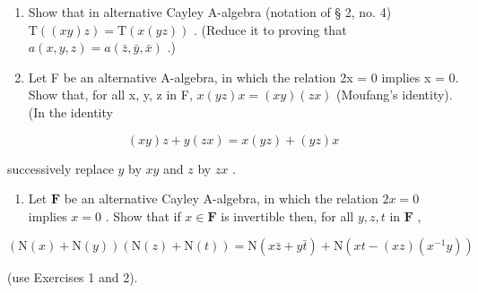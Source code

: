 \BourbakiAppendixExercises

\begin{enumerate}
\def\labelenumi{\arabic{enumi}.}
\item
  Show that in alternative Cayley A-algebra (notation of § 2, no. 4) \(\mathrm{T}((xy)z) = \mathrm{T}(x(yz))\) . (Reduce it to proving that \(a(x,y,z) = a(\bar{z},\bar{y},\bar{x})\) .)
\item
  Let F be an alternative A-algebra, in which the relation 2x = 0 implies x = 0. Show that, for all x, y, z in F, \(x(yz)x = (xy)(zx)\) (Moufang's identity). (In the identity
\end{enumerate}

\[
(x y) z + y (z x) = x (y z) + (y z) x
\]

successively replace \(y\) by \(xy\) and \(z\) by \(zx\) .

\begin{enumerate}
\def\labelenumi{\arabic{enumi}.}
\setcounter{enumi}{2}
\tightlist
\item
  Let \(\mathbf{F}\) be an alternative Cayley A-algebra, in which the relation \(2x = 0\) implies \(x = 0\) . Show that if \(x \in \mathbf{F}\) is invertible then, for all \(y, z, t\) in \(\mathbf{F}\) ,
\end{enumerate}

\[
(\mathrm{N} (x) + \mathrm{N} (y)) (\mathrm{N} (z) + \mathrm{N} (t)) = \mathrm{N} (x \bar {z} + y \bar {t}) + \mathrm{N} (x t - (x z) (x ^ {- 1} y))
\]

(use Exercises 1 and 2).
\relax{}
\backmatter
